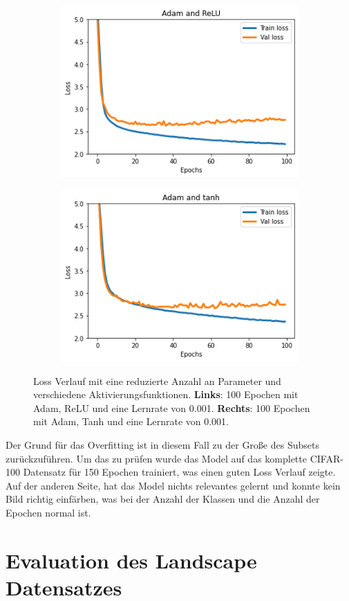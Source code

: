 \begin{figure}[H]
  \centering
  \vspace{1cm}
  \begin{subfigure}
    \centering
    \includegraphics[width=.48\textwidth]{resources/experiments/cifar-adam-relu.png}
  \end{subfigure}
  \begin{subfigure}
    \centering
    \includegraphics[width=.48\textwidth]{resources/experiments/cifar-adam-tanh-100.png}
  \end{subfigure}

  \caption{Loss Verlauf mit eine reduzierte Anzahl an Parameter und verschiedene Aktivierungsfunktionen. 
  \textbf{Links}: 100 Epochen mit Adam, ReLU und eine Lernrate von 0.001. \textbf{Rechts}: 100 Epochen mit Adam, Tanh und eine Lernrate von 0.001.}
  \label{image:gute-ergebnisse-cifar}
\end{figure}

Der Grund für das Overfitting ist in diesem Fall zu der Große des Subsets zurückzuführen. Um das zu prüfen wurde das Model auf das komplette CIFAR-100
Datensatz für 150 Epochen trainiert, was einen guten Loss Verlauf zeigte. Auf der anderen Seite, hat das Model nichts relevantes gelernt und 
konnte kein Bild richtig einfärben, was bei der Anzahl der Klassen und die Anzahl der Epochen normal ist.

\section{Evaluation des Landscape Datensatzes}
	

